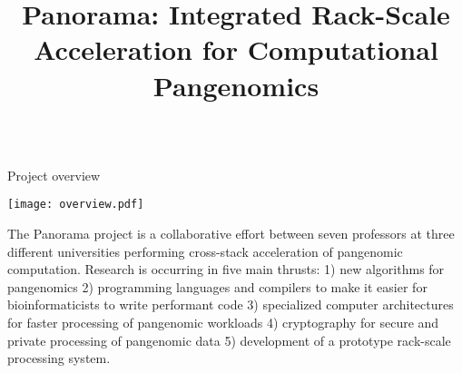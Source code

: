 \documentclass{cbxposter}
\title
{%
  Panorama: Integrated Rack-Scale Acceleration for Computational Pangenomics
}
\renewcommand{\smallskip}{\vspace{0.16667in}}
\begin{document}
\begin{frame}[fragile,t]{}
\vspace{0.1in}
\begin{columns}[T]


\begin{column}{10.5in}
\vspace{0.4in}


\begin{block}{Project overview}
  \begin{center}
    \texttt{[image: overview.pdf]}
  \end{center}

  \smallskip

  The Panorama project is a collaborative effort between seven professors
  at three different universities performing cross-stack acceleration of
  pangenomic computation. Research is occurring in five main thrusts: 1)
  new algorithms for pangenomics 2) programming languages and compilers to
  make it easier for bioinformaticists to write performant code 3)
  specialized computer architectures for faster processing of pangenomic
  workloads 4) cryptography for secure and private processing of pangenomic
  data 5) development of a prototype rack-scale processing system.


\end{block}
\end{column}
\end{columns}
\end{frame}
\end{document}

